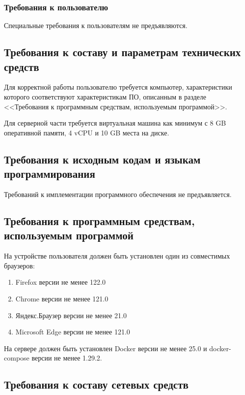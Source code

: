 \subsubsection{Требования к пользователю}

Специальные требования к пользователям не предъявляются.

\subsection{Требования к составу и параметрам технических средств}

Для корректной работы пользователю требуется компьютер, характеристики которого соответствуют характеристикам ПО, описанным в разделе <<Требования к программным средствам, используемым программой>>.

Для серверной части требуется виртуальная машина как минимум с 8 GB оперативной памяти, 4 vCPU и 10 GB места на диске.
    
\subsection{Требования к исходным кодам и языкам программирования}

Требований к имплементации программного обеспечения не предъявляется.

\subsection{Требования к программным средствам, используемым программой}

На устройстве пользователя должен быть установлен один из совместимых браузеров:

\begin{enumerate}
    \item Firefox версии не менее 122.0
    \item Chrome версии не менее 121.0
    \item Яндекс.Браузер версии не менее 21.0
    \item Microsoft Edge версии не менее 121.0
\end{enumerate}

На сервере должен быть установлен Docker версии не менее 25.0 и docker-compose версии не менее 1.29.2.

\subsection{Требования к составу сетевых средств}

